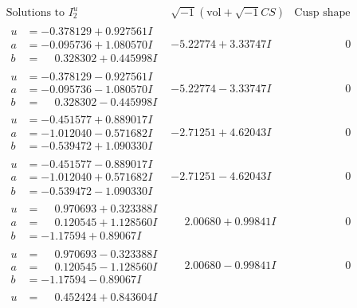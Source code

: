 \documentclass[1p]{elsarticle_modified}
\theoremstyle{definition}
\newcommand{\I}{\sqrt{-1}}
\begin{document}
$$\begin{array}{c|c|c}  
\text{Solutions to }I^u_{2}& \I (\text{vol} + \sqrt{-1}CS) & \text{Cusp shape}\\
 \hline 
\begin{aligned}
u &= -0.378129 + 0.927561 I \\
a &= -0.095736 + 1.080570 I \\
b &= \phantom{-}0.328302 + 0.445998 I\end{aligned}
 & -5.22774 + 3.33747 I & \phantom{-0.000000 } 0 \\ \hline\begin{aligned}
u &= -0.378129 - 0.927561 I \\
a &= -0.095736 - 1.080570 I \\
b &= \phantom{-}0.328302 - 0.445998 I\end{aligned}
 & -5.22774 - 3.33747 I & \phantom{-0.000000 } 0 \\ \hline\begin{aligned}
u &= -0.451577 + 0.889017 I \\
a &= -1.012040 - 0.571682 I \\
b &= -0.539472 + 1.090330 I\end{aligned}
 & -2.71251 + 4.62043 I & \phantom{-0.000000 } 0 \\ \hline\begin{aligned}
u &= -0.451577 - 0.889017 I \\
a &= -1.012040 + 0.571682 I \\
b &= -0.539472 - 1.090330 I\end{aligned}
 & -2.71251 - 4.62043 I & \phantom{-0.000000 } 0 \\ \hline\begin{aligned}
u &= \phantom{-}0.970693 + 0.323388 I \\
a &= \phantom{-}0.120545 + 1.128560 I \\
b &= -1.17594 + 0.89067 I\end{aligned}
 & \phantom{-}2.00680 + 0.99841 I & \phantom{-0.000000 } 0 \\ \hline\begin{aligned}
u &= \phantom{-}0.970693 - 0.323388 I \\
a &= \phantom{-}0.120545 - 1.128560 I \\
b &= -1.17594 - 0.89067 I\end{aligned}
 & \phantom{-}2.00680 - 0.99841 I & \phantom{-0.000000 } 0 \\ \hline\begin{aligned}
u &= \phantom{-}0.452424 + 0.843604 I \\

\end{aligned}
\end{array}$$
\end{document}
